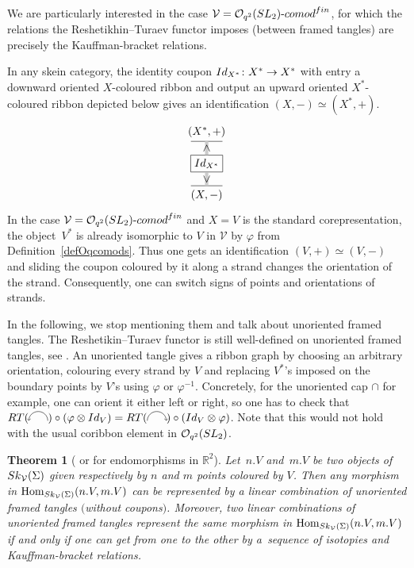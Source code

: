 \documentclass[11pt]{article}
\numberwithin{equation}{section}
\numberwithin{equation}{section}
\newtheorem{Theorem}{Theorem}[section]
\newcommand{\rcap}{\tikz[scale = 0.3] \draw[->] (0,0) arc(180:0:1);}
\newcommand{\lcap}{\tikz[scale = 0.3] \draw[<-] (0,0) arc(180:0:1);}
\newcommand{\Hom}{\operatorname{Hom}}
\newcommand{\Oq}{\mathcal{O}_{q^2}({\rm SL}_2)}
\begin{document}
\setcounter{Theorem}{19}
\begin{Example}
We are particularly interested in the case $\mathcal{V} = \Oq\text{-}{\rm comod}^{\rm fin}$, for which the relations the Reshetikhin--Turaev functor imposes (between framed tangles) are precisely the Kauffman-bracket relations.
\end{Example}

\begin{Remark}\label{rmkUnorTanOq}
In any skein category, the identity coupon ${\rm Id}_{X^*}\colon X^* \to X^*$ with entry a downward oriented $X$-coloured ribbon and output an upward oriented $X^*$-coloured ribbon depicted below gives an identification $(X,-) \simeq (X^*,+)$.
$$
\begin{tikzpicture}[yscale = 0.7, baseline = 0pt]
\draw (0,0) -- (1,0) node[midway,below]{\small $(X,-)$};
\draw (0,2) -- (1,2) node[midway,above]{\small $(X^*,+)$};
\node[draw, rectangle] (I) at (0.5,1) {\small ${\rm Id}_{X^*}$};
\draw[gray!40, line width = 3pt] (0.5,0) -- (I) node[midway, sloped, black]{$<$} -- (0.5,2) node[midway, sloped, black]{$>$};
\end{tikzpicture}
$$
In the case $\mathcal{V} = \Oq\text{-}{\rm comod}^{\rm fin}$ and $X = V$ is the standard corepresentation, the object~$V^*$ is already isomorphic to $V$ in $\mathcal{V}$ by $\varphi$ from Definition~\ref{defOqcomods}. Thus one gets an identification $(V,+) \simeq (V,-)$ and sliding the coupon coloured by it along a strand changes the orientation of the strand. Consequently, one can switch signs of points and orientations of strands.
\end{Remark}

 In the following, we stop mentioning them and talk about unoriented framed tangles. The Reshetikin--Turaev functor is still well-defined on unoriented framed tangles, see \cite[Theorem~4.2]{Tingley}. An unoriented tangle gives a ribbon graph by choosing an arbitrary orientation, colouring every strand by $V$ and replacing $V^*$'s imposed on the boundary points by $V$'s using $\varphi$ or $\varphi^{-1}$. Concretely, for the unoriented cap $\cap$ for example, one can orient it either left or right, so one has to check that $\mathop{\rm RT}(\lcap) \circ (\varphi \otimes {\rm Id}_V) = \mathop{\rm RT}(\rcap) \circ ({\rm Id}_V \otimes \varphi)$. Note that this would not hold with the usual coribbon element in $\Oq$.

{\sloppy\begin{Theorem}[{\cite[Theorem~12.3.10]{CP}} or {\cite[Theorem~3.3.4]{Carter}} for endomorphisms in $\mathbb{R}^2$]\label{thmSkAsTangles}
Let~$n.V$ and~$m.V$ be two objects of ${\rm Sk}_\mathcal{V}(\Sigma)$ given respectively by $n$ and $m$ points coloured by $V$. Then any morphism in $\Hom_{{\rm Sk}_\mathcal{V}(\Sigma)}(n.V,m.V)$ can be represented by a linear combination of unoriented framed tangles $($without coupons$)$. Moreover, two linear combinations of unoriented framed tangles represent the same morphism in $\Hom_{{\rm Sk}_\mathcal{V}(\Sigma)}(n.V,m.V)$ if and only if one can get from one to the other by a~sequence of isotopies and Kauffman-bracket relations.
\end{Theorem}}
\end{document}
